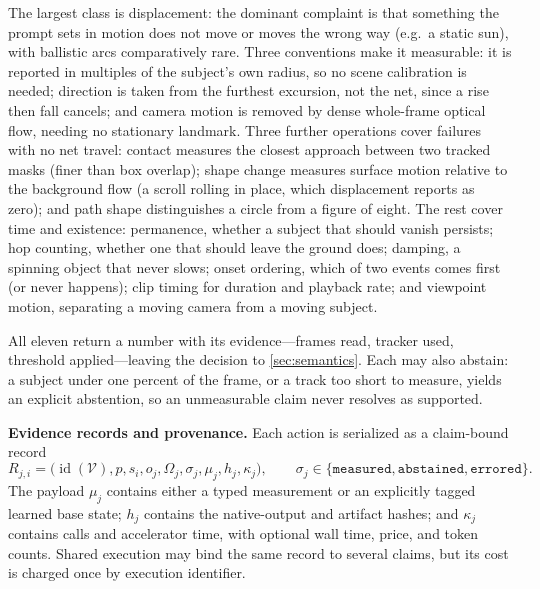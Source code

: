 The largest class is displacement: the dominant complaint is that something the prompt sets in motion does not move or moves the wrong way (e.g.\ a static sun), with ballistic arcs comparatively rare. Three conventions make it measurable: it is reported in multiples of the subject's own radius, so no scene calibration is needed; direction is taken from the furthest excursion, not the net, since a rise then fall cancels; and camera motion is removed by dense whole-frame optical flow, needing no stationary landmark. Three further operations cover failures with no net travel: contact measures the closest approach between two tracked masks (finer than box overlap); shape change measures surface motion relative to the background flow (a scroll rolling in place, which displacement reports as zero); and path shape distinguishes a circle from a figure of eight. The rest cover time and existence: permanence, whether a subject that should vanish persists; hop counting, whether one that should leave the ground does; damping, a spinning object that never slows; onset ordering, which of two events comes first (or never happens); clip timing for duration and playback rate; and viewpoint motion, separating a moving camera from a moving subject.

All eleven return a number with its evidence---frames read, tracker used, threshold applied---leaving the decision to \cref{sec:semantics}. Each may also abstain: a subject under one percent of the frame, or a track too short to measure, yields an explicit abstention, so an unmeasurable claim never resolves as supported.

\medskip\noindent\textbf{Evidence records and provenance.}\quad
\label{sec:contract}%
Each action is serialized as a claim-bound record
\begin{equation}
R_{j,i}
=
\bigl(\operatorname{id}(\mathcal V),p,s_i,o_j,\Omega_j,
       \sigma_j,\mu_j,h_j,\kappa_j\bigr),
\qquad
\sigma_j\in
\{\mathtt{measured},\mathtt{abstained},\mathtt{errored}\}.
\label{eq:evidence-record}
\end{equation}
The payload $\mu_j$ contains either a typed measurement or an explicitly tagged
learned base state; $h_j$ contains the native-output and artifact hashes; and
$\kappa_j$ contains calls and accelerator time, with optional wall time, price,
and token counts. Shared execution may bind the same record to several claims,
but its cost is charged once by execution identifier.

